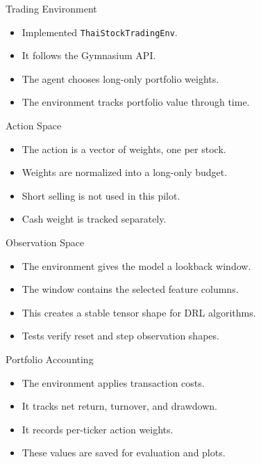 \documentclass[aspectratio=43,10pt]{beamer}
\begin{document}
\begin{frame}{Trading Environment}
\begin{itemize}
  \item Implemented \texttt{ThaiStockTradingEnv}.
  \item It follows the Gymnasium API.
  \item The agent chooses long-only portfolio weights.
  \item The environment tracks portfolio value through time.
\end{itemize}
\end{frame}

\begin{frame}{Action Space}
\begin{itemize}
  \item The action is a vector of weights, one per stock.
  \item Weights are normalized into a long-only budget.
  \item Short selling is not used in this pilot.
  \item Cash weight is tracked separately.
\end{itemize}
\end{frame}

\begin{frame}{Observation Space}
\begin{itemize}
  \item The environment gives the model a lookback window.
  \item The window contains the selected feature columns.
  \item This creates a stable tensor shape for DRL algorithms.
  \item Tests verify reset and step observation shapes.
\end{itemize}
\end{frame}

\begin{frame}{Portfolio Accounting}
\begin{itemize}
  \item The environment applies transaction costs.
  \item It tracks net return, turnover, and drawdown.
  \item It records per-ticker action weights.
  \item These values are saved for evaluation and plots.
\end{itemize}
\end{frame}
\end{document}

